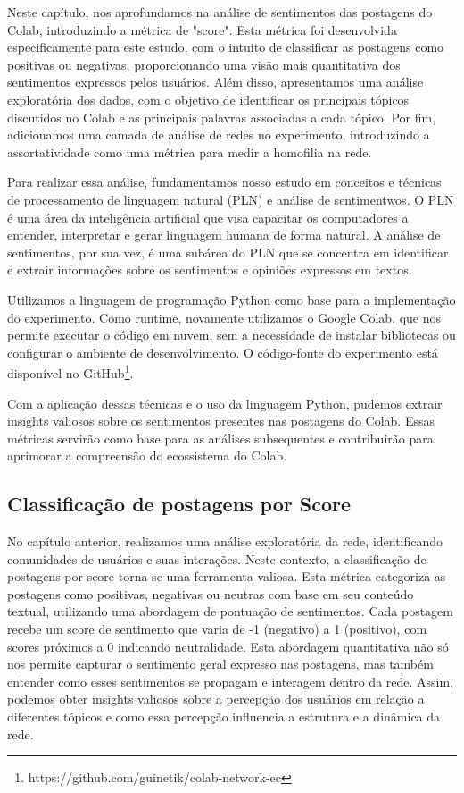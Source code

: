 Neste capítulo, nos aprofundamos na análise de sentimentos das postagens do Colab, introduzindo a métrica de "score". Esta métrica foi desenvolvida especificamente para este estudo, com o intuito de classificar as postagens como positivas ou negativas, proporcionando uma visão mais quantitativa dos sentimentos expressos pelos usuários. Além disso, apresentamos uma análise exploratória dos dados, com o objetivo de identificar os principais tópicos discutidos no Colab e as principais palavras associadas a cada tópico. Por fim, adicionamos uma camada de análise de redes no experimento, introduzindo a assortatividade como uma métrica para medir a homofilia na rede.

Para realizar essa análise, fundamentamos nosso estudo em conceitos e técnicas de processamento de linguagem natural (PLN) e análise de sentimentwos. O PLN é uma área da inteligência artificial que visa capacitar os computadores a entender, interpretar e gerar linguagem humana de forma natural. A análise de sentimentos, por sua vez, é uma subárea do PLN que se concentra em identificar e extrair informações sobre os sentimentos e opiniões expressos em textos.

Utilizamos a linguagem de programação Python como base para a implementação do experimento. Como runtime, novamente utilizamos o Google Colab, que nos permite executar o código em nuvem, sem a necessidade de instalar bibliotecas ou configurar o ambiente de desenvolvimento. O código-fonte do experimento está disponível no GitHub\footnote{https://github.com/guinetik/colab-network-ec}.

Com a aplicação dessas técnicas e o uso da linguagem Python, pudemos extrair insights valiosos sobre os sentimentos presentes nas postagens do Colab. Essas métricas servirão como base para as análises subsequentes e contribuirão para aprimorar a compreensão do ecossistema do Colab.

\subsection{Classificação de postagens por Score}

No capítulo anterior, realizamos uma análise exploratória da rede, identificando comunidades de usuários e suas interações. Neste contexto, a classificação de postagens por score torna-se uma ferramenta valiosa. Esta métrica categoriza as postagens como positivas, negativas ou neutras com base em seu conteúdo textual, utilizando uma abordagem de pontuação de sentimentos. Cada postagem recebe um score de sentimento que varia de -1 (negativo) a 1 (positivo), com scores próximos a 0 indicando neutralidade. Esta abordagem quantitativa não só nos permite capturar o sentimento geral expresso nas postagens, mas também entender como esses sentimentos se propagam e interagem dentro da rede. Assim, podemos obter insights valiosos sobre a percepção dos usuários em relação a diferentes tópicos e como essa percepção influencia a estrutura e a dinâmica da rede.

